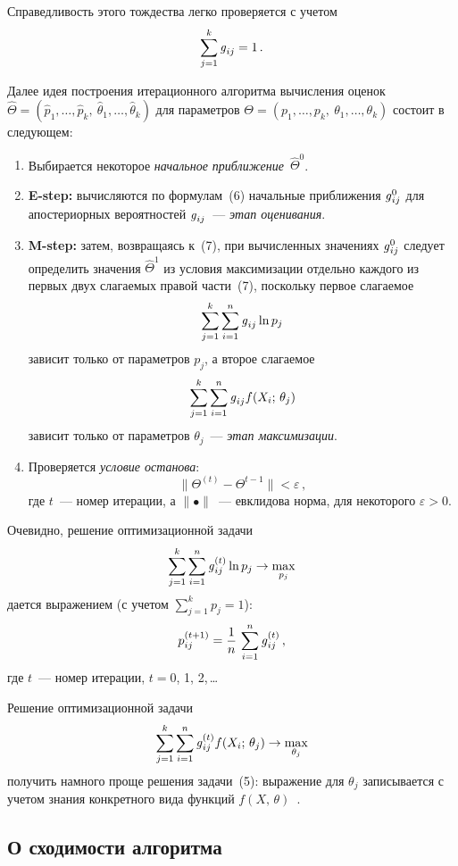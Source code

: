 \begin{multicols}{2}
Справедливость этого тождества легко проверяется с учетом
$$
\sum\limits_{j=1}^k \mbox{\textit{g}}_{ij} =1\,.
$$

Далее идея построения итерационного алгоритма вычисления оценок
$\hat{\Theta} = (\hat{p}_1,\ldots , \hat{p}_k,\
\hat{\theta}_1,\ldots , \hat{\theta}_k)$
для параметров $\Theta = (p_1,\ldots , p_k,\ \theta_1,\ldots , \theta_k)$ состоит в
следующем:
\begin{enumerate}[1.]
\item Выбирается некоторое \textit{начальное приближение}~$\hat{\Theta}^0$.
\item \textbf{E-step:} вычисляются по формулам~(6) начальные приближения
$\mbox{\textit{g}}_{ij}^0$ для апостериорных вероятностей $\mbox{\textit{g}}_{ij}$~--- \textit{этап
оценивания}.
\item \textbf{M-step:} затем, возвращаясь к~(7), при вычисленных значениях
$\mbox{\textit{g}}^0_{ij}$ следует определить значения $\hat{\Theta}^1$ из условия
максимизации отдельно каждого из первых двух слагаемых правой
части~(7), поскольку первое слагаемое
$$
\sum_{j=1}^k \sum_{i=1}^n \mbox{\textit{g}}_{ij} \ln p_j
$$
зависит только от параметров $p_j$, а второе слагаемое
$$
\sum_{j=1}^k \sum_{i=1}^n \mbox{\textit{g}}_{ij} f(X_i;\,\theta_j )
$$
зависит только от параметров $\theta_j$~--- \textit{этап максимизации}.
\item Проверяется \textit{условие останова}:
$$
\parallel \Theta^{(t)} - \Theta^{t-1}\parallel <\varepsilon\,,
$$
где $t$~--- номер итерации, а
$\parallel\bullet\parallel$~--- евклидова норма, для некоторого $\varepsilon
>0$.
\end{enumerate}

Очевидно, решение оптимизационной задачи
$$
\sum\limits_{j=1}^k\sum\limits_{i=1}^n \mbox{\textit{g}}_{ij}^{(t)}\ln p_j \rightarrow
\underset{p_j}{\max}
$$
дается выражением (с учетом $\sum_{j=1}^k p_j =1$):
$$
p_{ij}^{(t+1)} =\displaystyle\frac{\displaystyle 1\mathstrut}{\displaystyle n\mathstrut}\,\sum\limits_{i=1}^n \mbox{\textit{g}}_{ij}^{(t)}\,,
$$
где $t$~--- номер итерации, $t = 0$, 1, 2,\,\ldots

Решение оптимизационной задачи
$$
\sum\limits_{j=1}^k \sum\limits_{i=1}^n \mbox{\textit{g}}_{ij}^{(t)} f(X_i;\,\theta_j )
\rightarrow \underset{\theta_j}{\max}
$$
получить намного проще решения задачи~(5): выражение для $\theta_j$
записывается с учетом знания конкретного вида функций
$f(X,\,\theta)$~\cite{3bat}.

\subsection{О сходимости алгоритма} %


\end{multicols}
